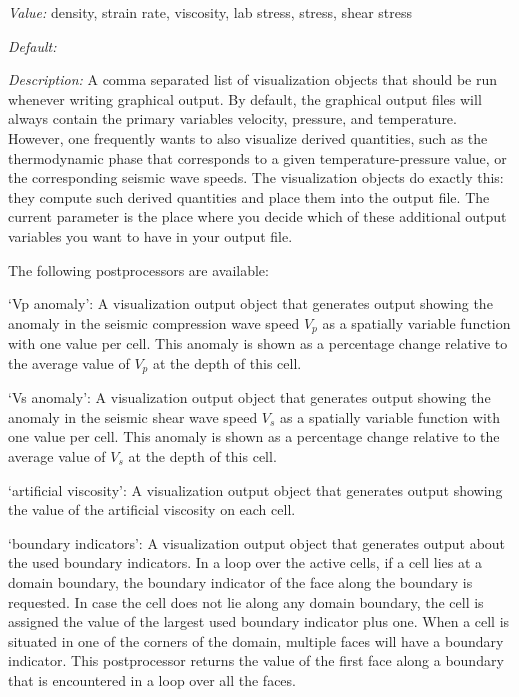\begin{itemize}
{\it Value:} density, strain rate, viscosity, lab stress, stress, shear stress


{\it Default:} 


{\it Description:} A comma separated list of visualization objects that should be run whenever writing graphical output. By default, the graphical output files will always contain the primary variables velocity, pressure, and temperature. However, one frequently wants to also visualize derived quantities, such as the thermodynamic phase that corresponds to a given temperature-pressure value, or the corresponding seismic wave speeds. The visualization objects do exactly this: they compute such derived quantities and place them into the output file. The current parameter is the place where you decide which of these additional output variables you want to have in your output file.

The following postprocessors are available:

`Vp anomaly': A visualization output object that generates output showing the anomaly in the seismic compression wave speed $V_p$ as a spatially variable function with one value per cell. This anomaly is shown as a percentage change relative to the average value of $V_p$ at the depth of this cell.

`Vs anomaly': A visualization output object that generates output showing the anomaly in the seismic shear wave speed $V_s$ as a spatially variable function with one value per cell. This anomaly is shown as a percentage change relative to the average value of $V_s$ at the depth of this cell.

`artificial viscosity': A visualization output object that generates output showing the value of the artificial viscosity on each cell.

`boundary indicators': A visualization output object that generates output about the used boundary indicators. In a loop over the active cells, if a cell lies at a domain boundary, the boundary indicator of the face along the boundary is requested. In case the cell does not lie along any domain boundary, the cell is assigned the value of the largest used boundary indicator plus one. When a cell is situated in one of the corners of the domain, multiple faces will have a boundary indicator. This postprocessor returns the value of the first face along a boundary that is encountered in a loop over all the faces. 


\end{itemize}
